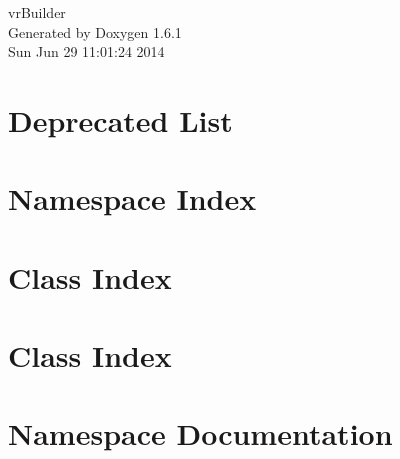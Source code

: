 \documentclass[a4paper]{book}
\begin{document}
\hypersetup{pageanchor=false}
\begin{titlepage}
\vspace*{7cm}
\begin{center}
{\Large vrBuilder }\\
\vspace*{1cm}
{\large Generated by Doxygen 1.6.1}\\
\vspace*{0.5cm}
{\small Sun Jun 29 11:01:24 2014}\\
\end{center}
\end{titlepage}
\clearemptydoublepage
{}
\tableofcontents
\clearemptydoublepage
{}
\hypersetup{pageanchor=true}
\chapter{Deprecated List}
\label{deprecated}
\hypertarget{deprecated}{}

\chapter{Namespace Index}

\chapter{Class Index}

\chapter{Class Index}

\chapter{Namespace Documentation}

\end{document}
